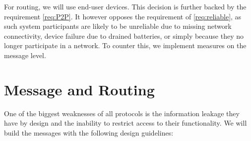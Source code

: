 For routing, we will use end-user devices. This decision is further backed by the requirement \ref{req:P2P}. It however opposes the requirement of \ref{req:reliable}, as such system participants are likely to be unreliable due to missing network connectivity, device failure due to drained batteries, or simply because they no longer participate in a network. To counter this, we implement measures on the message level.


\section{Message and Routing}
One of the biggest weaknesses of all protocols is the information leakage they have by design and the inability to restrict access to their functionality. We will build the messages with the following design guidelines:
